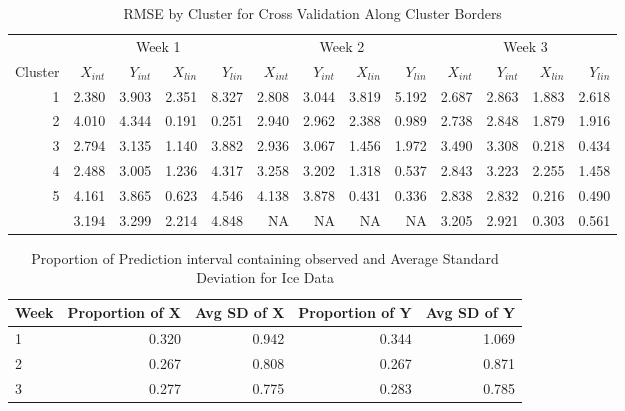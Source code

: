 \documentclass[12pt]{article}
\begin{document}
\begin{table}

\caption{\label{tab:border-clust-tab}RMSE by Cluster for Cross Validation Along Cluster Borders}
\centering
\begin{tabular}[t]{rrrrrrrrrrrrr}
\toprule
\multicolumn{1}{c}{ } & \multicolumn{4}{c}{Week 1} & \multicolumn{4}{c}{Week 2} & \multicolumn{4}{c}{Week 3} \\
\cmidrule(l{3pt}r{3pt}){2-5} \cmidrule(l{3pt}r{3pt}){6-9} \cmidrule(l{3pt}r{3pt}){10-13}
Cluster & $X_{int}$ & $Y_{int}$ & $X_{lin}$ & $Y_{lin}$ & $X_{int}$ & $Y_{int}$ & $X_{lin}$ & $Y_{lin}$ & $X_{int}$ & $Y_{int}$ & $X_{lin}$ & $Y_{lin}$\\
\midrule
1 & 2.380 & 3.903 & 2.351 & 8.327 & 2.808 & 3.044 & 3.819 & 5.192 & 2.687 & 2.863 & 1.883 & 2.618\\
2 & 4.010 & 4.344 & 0.191 & 0.251 & 2.940 & 2.962 & 2.388 & 0.989 & 2.738 & 2.848 & 1.879 & 1.916\\
3 & 2.794 & 3.135 & 1.140 & 3.882 & 2.936 & 3.067 & 1.456 & 1.972 & 3.490 & 3.308 & 0.218 & 0.434\\
4 & 2.488 & 3.005 & 1.236 & 4.317 & 3.258 & 3.202 & 1.318 & 0.537 & 2.843 & 3.223 & 2.255 & 1.458\\
5 & 4.161 & 3.865 & 0.623 & 4.546 & 4.138 & 3.878 & 0.431 & 0.336 & 2.838 & 2.832 & 0.216 & 0.490\\
\addlinespace
6 & 3.194 & 3.299 & 2.214 & 4.848 & NA & NA & NA & NA & 3.205 & 2.921 & 0.303 & 0.561\\
\bottomrule
\end{tabular}
\end{table}

\begin{table}

\caption{\label{tab:cp-table-border}Proportion of Prediction interval containing observed and Average Standard Deviation for Ice Data}
\centering
\begin{tabular}[t]{lrrrr}
\toprule
Week & Proportion of X & Avg SD of X & Proportion of Y & Avg SD of Y\\
\midrule
1 & 0.320 & 0.942 & 0.344 & 1.069\\
2 & 0.267 & 0.808 & 0.267 & 0.871\\
3 & 0.277 & 0.775 & 0.283 & 0.785\\
\bottomrule
\end{tabular}
\end{table}
\end{document}
